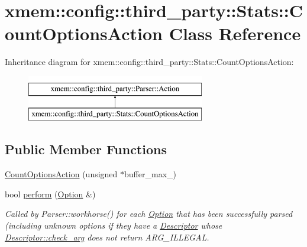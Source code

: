 \hypertarget{classxmem_1_1config_1_1third__party_1_1_stats_1_1_count_options_action}{\section{xmem\-:\-:config\-:\-:third\-\_\-party\-:\-:Stats\-:\-:Count\-Options\-Action Class Reference}
\label{classxmem_1_1config_1_1third__party_1_1_stats_1_1_count_options_action}
}
Inheritance diagram for xmem\-:\-:config\-:\-:third\-\_\-party\-:\-:Stats\-:\-:Count\-Options\-Action\-:\begin{figure}[H]
\begin{center}
\leavevmode
\includegraphics[height=2.000000cm]{classxmem_1_1config_1_1third__party_1_1_stats_1_1_count_options_action}
\end{center}
\end{figure}
\subsection*{Public Member Functions}
\begin{DoxyCompactItemize}
\item 
\hyperlink{classxmem_1_1config_1_1third__party_1_1_stats_1_1_count_options_action_ae3105daa0bee8d16e4fbe17e6306bd1a}{Count\-Options\-Action} (unsigned $\ast$buffer\-\_\-max\-\_\-)
\item 
bool \hyperlink{classxmem_1_1config_1_1third__party_1_1_stats_1_1_count_options_action_aeacb83b2ed1520519dbfd678ac53b144}{perform} (\hyperlink{classxmem_1_1config_1_1third__party_1_1_option}{Option} \&)
\begin{DoxyCompactList}\small\item\em Called by Parser\-::workhorse() for each \hyperlink{classxmem_1_1config_1_1third__party_1_1_option}{Option} that has been successfully parsed (including unknown options if they have a \hyperlink{structxmem_1_1config_1_1third__party_1_1_descriptor}{Descriptor} whose \hyperlink{structxmem_1_1config_1_1third__party_1_1_descriptor_a65b39f8d61de820bb5001d590e7dea5d}{Descriptor\-::check\-\_\-arg} does not return A\-R\-G\-\_\-\-I\-L\-L\-E\-G\-A\-L. \end{DoxyCompactList}\end{DoxyCompactItemize}


